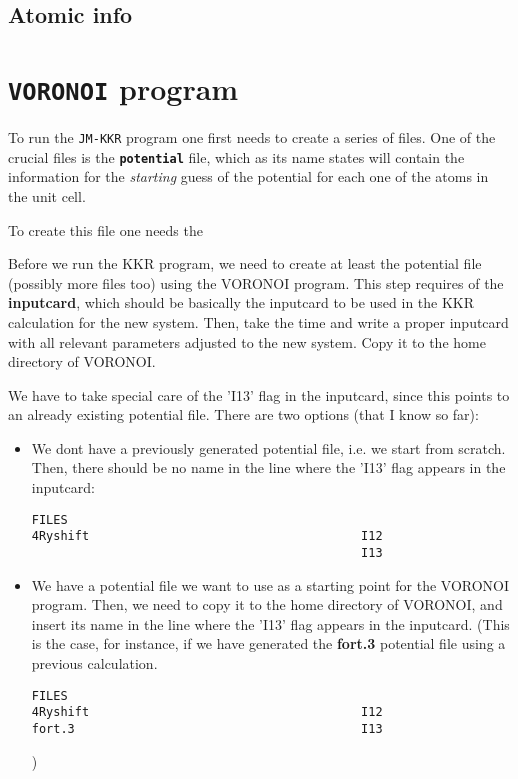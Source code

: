\documentclass[11pt,fleqn]{book} %
\begin{document}
\subsection{Atomic info}



\section{\texttt{VORONOI} program}
\label{sec:voronoi}

To run the \verb;JM-KKR; program one first needs to create a series of files. One of the crucial files is the \textbf{\texttt{potential}} file, which as its name states will contain the information for the \textit{starting} guess of the potential for each one of the atoms in the unit cell. 

To create this file one needs the  

Before we run the KKR program, we need to create at least
the potential file (possibly more files too) using the VORONOI
program. This step requires of the \textbf{inputcard}, which should
be basically the inputcard to be used in the KKR calculation
for the new system. Then, take the time and write a proper
inputcard with all relevant parameters adjusted to the new system.
Copy it to the home directory of VORONOI.


We have to take special care of the 'I13' flag in the
inputcard, since this points to an already existing potential file.
There are two options (that I know so far):

\begin{itemize}
\item We dont have a previously generated potential file, i.e. we start from
scratch. Then, there should be no name in the line where the 'I13' flag appears
in the inputcard:
\begin{VBox}
\begin{verbatim}
FILES
4Ryshift                                      I12
                                              I13
\end{verbatim}
\end{VBox}

\item We have a potential file we want to use as a starting point for the
VORONOI program. Then, we need to copy it to the home directory of VORONOI,
and insert its name in the line where the 'I13' flag appears
in the inputcard. (This is the case, for instance, if we have generated the
\textbf{fort.3} potential file using a previous calculation.

\begin{VBox}
\begin{verbatim}
FILES
4Ryshift                                      I12
fort.3                                        I13
\end{verbatim}
\end{VBox}
)

\end{itemize}
\end{document}
